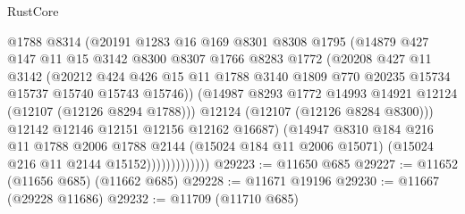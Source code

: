 \begin{lexlean}{RustCore}
\begin{coremodule}
                          @1788
                          @8314
                          (@20191
                            @1283
                            @16
                            @169
                            @8301
                            @8308
                            @1795
                            (@14879
                              @427
                              @147
                              @11
                              @15
                              @3142
                              @8300
                              @8307
                              @1766
                              @8283
                              @1772
                              (@20208
                                @427
                                @11
                                @3142
                                (@20212
                                  @424
                                  @426
                                  @15
                                  @11
                                  @1788
                                  @3140
                                  @1809
                                  @770
                                  @20235
                                  @15734
                                  @15737
                                  @15740
                                  @15743
                                  @15746))
                              (@14987
                                @8293
                                @1772
                                @14993
                                @14921
                                @12124
                                (@12107 (@12126 @8294 @1788)))
                              @12124
                              (@12107 (@12126 @8284 @8300)))
                            @12142
                            @12146
                            @12151
                            @12156
                            @12162
                            @16687)
                          (@14947
                            @8310
                            @184
                            @216
                            @11
                            @1788
                            @2006
                            @1788
                            @2144
                            (@15024 @184 @11 @2006 @15071)
                            (@15024 @216 @11 @2144 @15152)))))))))))))
@29223 := @11650 @685
@29227 := @11652 (@11656 @685) (@11662 @685)
@29228 := @11671 @19196
@29230 := @11667 (@29228 @11686)
@29232 := @11709 (@11710 @685)

\end{coremodule}
\end{lexlean}
